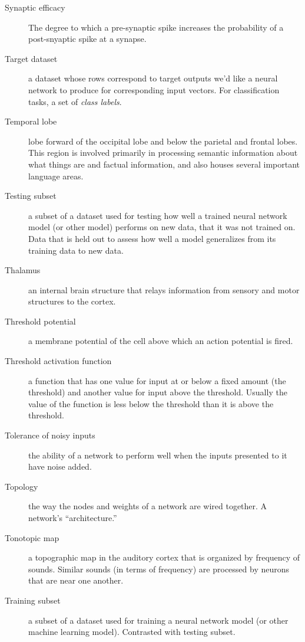 \begin{description}
\item[Synaptic efficacy] The degree to which a pre-synaptic spike increases the probability of a post-snyaptic spike at a synapse.

\item[Target dataset] a dataset whose rows correspond to target outputs we'd like a neural network to produce for corresponding input vectors. For classification tasks, a set of \emph{class labels}.

\item[Temporal lobe] lobe forward of the occipital lobe and below the parietal and frontal lobes. This region is involved primarily in processing semantic information about what things are and factual information, and also houses several important language areas.

\item[Testing subset] a subset of a dataset used for testing how well a trained neural network model (or other model) performs on new data, that it was not trained on. Data that is held out to assess how well a model generalizes from its training data to new data.

\item[Thalamus] an internal brain structure that relays information from sensory and motor structures to the cortex.

\item[Threshold potential] a membrane potential of the cell above which an action potential is fired. 

\item[Threshold activation function] a function that has one value for  input at or below a fixed amount (the threshold) and another value for input above the threshold. Usually the value of the function is less below the  threshold than it is above the threshold.

\item[Tolerance of noisy inputs] the ability of a network to perform well when the inputs presented to it have noise added.

\item[Topology] the way the nodes and weights of a network are wired together. A network's ``architecture.''

\item[Tonotopic map] a topographic map in the auditory cortex that is organized by frequency of sounds. Similar sounds (in terms of frequency) are processed by neurons that are near one another.

\item[Training subset] a subset of a dataset used for training a neural network model (or other machine learning model). Contrasted with testing subset.


\end{description}

